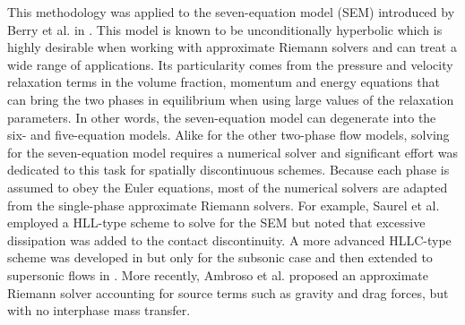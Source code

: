 \documentclass[preprint,10pt]{elsarticle}
\begin{document}
This methodology was applied to the seven-equation model (SEM) introduced by Berry et al. in \cite{SEM}. This model is known to be unconditionally hyperbolic which is highly desirable when working with approximate Riemann solvers and can treat a wide range of applications. Its particularity comes from the pressure and velocity relaxation terms in the volume fraction, momentum and energy equations that can bring the two phases in equilibrium when using large values of the relaxation parameters. In other words, the seven-equation model can degenerate into the six- and five-equation models. Alike for the other two-phase flow models, solving for the seven-equation model requires a numerical solver and significant effort was dedicated to this task for spatially discontinuous schemes. Because each phase is assumed to obey the Euler equations, most of the numerical solvers are adapted from the single-phase approximate Riemann solvers. For example, Saurel et al. \cite{Saurel_2001a, Saurel_2001b} employed a HLL-type scheme to solve for the SEM but noted that excessive dissipation was added to the contact discontinuity. A more advanced HLLC-type scheme was developed in \cite{Li_2004} but only for the subsonic case and then extended to supersonic flows in \cite{Zein_2010}. More recently, Ambroso et al. \cite{Ambroso_2012} proposed an approximate Riemann solver accounting for source terms such as gravity and drag forces, but with no interphase mass transfer.
\end{document}
